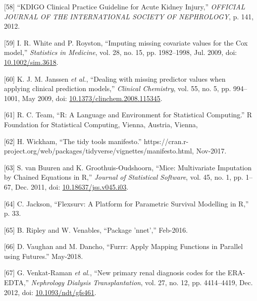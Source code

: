 \documentclass[12pt,twoside]{reedthesis}
\newenvironment{cslreferences}%
  {}%
  {\par}
\begin{document}
\begin{cslreferences}
\leavevmode\hypertarget{ref-noauthor_kdigo_2012}{}%
{[}58{]} ``KDIGO Clinical Practice Guideline for Acute Kidney Injury,'' \emph{OFFICIAL JOURNAL OF THE INTERNATIONAL SOCIETY OF NEPHROLOGY}, p. 141, 2012.

\leavevmode\hypertarget{ref-white_imputing_2009}{}%
{[}59{]} I. R. White and P. Royston, ``Imputing missing covariate values for the Cox model,'' \emph{Statistics in Medicine}, vol. 28, no. 15, pp. 1982--1998, Jul. 2009, doi: \href{https://doi.org/10.1002/sim.3618}{10.1002/sim.3618}.

\leavevmode\hypertarget{ref-janssen_dealing_2009}{}%
{[}60{]} K. J. M. Janssen \emph{et al.}, ``Dealing with missing predictor values when applying clinical prediction models,'' \emph{Clinical Chemistry}, vol. 55, no. 5, pp. 994--1001, May 2009, doi: \href{https://doi.org/10.1373/clinchem.2008.115345}{10.1373/clinchem.2008.115345}.

\leavevmode\hypertarget{ref-r_core_team_r_nodate}{}%
{[}61{]} R. C. Team, ``R: A Language and Environment for Statistical Computing.'' R Foundation for Statistical Computing, Vienna, Austria, Vienna,

\leavevmode\hypertarget{ref-wickham_tidy_2017}{}%
{[}62{]} H. Wickham, ``The tidy tools manifesto.'' https://cran.r-project.org/web/packages/tidyverse/vignettes/manifesto.html, Nov-2017.

\leavevmode\hypertarget{ref-buuren_mice_2011-1}{}%
{[}63{]} S. van Buuren and K. Groothuis-Oudshoorn, ``Mice: Multivariate Imputation by Chained Equations in R,'' \emph{Journal of Statistical Software}, vol. 45, no. 1, pp. 1--67, Dec. 2011, doi: \href{https://doi.org/10.18637/jss.v045.i03}{10.18637/jss.v045.i03}.

\leavevmode\hypertarget{ref-jackson_flexsurv_nodate}{}%
{[}64{]} C. Jackson, ``Flexsurv: A Platform for Parametric Survival Modelling in R,'' p. 33.

\leavevmode\hypertarget{ref-ripley_package_2016}{}%
{[}65{]} B. Ripley and W. Venables, ``Package 'nnet','' Feb-2016.

\leavevmode\hypertarget{ref-vaughan_furrr_2018}{}%
{[}66{]} D. Vaughan and M. Dancho, ``Furrr: Apply Mapping Functions in Parallel using Futures.'' May-2018.

\leavevmode\hypertarget{ref-venkat-raman_new_2012}{}%
{[}67{]} G. Venkat-Raman \emph{et al.}, ``New primary renal diagnosis codes for the ERA-EDTA,'' \emph{Nephrology Dialysis Transplantation}, vol. 27, no. 12, pp. 4414--4419, Dec. 2012, doi: \href{https://doi.org/10.1093/ndt/gfs461}{10.1093/ndt/gfs461}.


\end{cslreferences}
\end{document}
